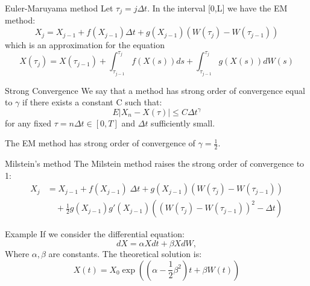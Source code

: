\begin{frame}{Euler-Maruyama method}
Let $\tau_j=j\Delta t$. In the interval [0,L] we have the EM method:\bigskip\\
$$X_j=X_{j-1}+f(X_{j-1})\Delta t+g(X_{j-1})(W(\tau_j)-W(\tau_{j-1}))$$
 which is an approximation for the equation
$$X(\tau_j)=X(\tau_{j-1})+\int_{\tau_{j-1}}^{\tau_{j}}f(X(s))ds+\int_
{\tau_{j-1}}^{\tau_{j}}g(X(s))dW(s)$$
\end{frame}

\begin{frame}
\begin{block}{Strong Convergence}
We say that a method has strong order of convergence equal to $\gamma$ if there exists a constant C such that:
$$E|X_n-X(\tau)|\leq C \Delta t^\gamma$$
for any fixed $\tau=n \Delta t \in [0,T]$ and $\Delta t$ sufficiently small.
\end{block}
\bigskip
The EM method has strong order of convergence of $\gamma=\frac{1}{2}$.
\end{frame}

\begin{frame}{Milstein's method}
The Milstein method raises the strong order of convergence to 1:	
	\begin{equation*}
	\begin{split}
	X_{j} & =X_{j-1}+ f(X_{j-1}) \; \Delta t + g(X_{j-1})(W(\tau_j)-W(\tau_{j-1}))\\
	  &\quad +\frac{1}{2}g(X_{j-1})g'(X_{j-1})((W(\tau_j)-W(\tau_{j-1}))^2-\Delta t)
	\end{split}
	\end{equation*}
\end{frame}

\begin{frame}{Example}
If we consider the differential equation:
\begin{equation*}
  dX=\alpha X dt+ \beta X dW,
\end{equation*}
Where $\alpha, \beta$ are constants. The theoretical solution is: 
\begin{equation*}
  X(t)=X_{0}\exp{\left((\alpha -\frac{1}{2}\beta ^2)t +\beta W(t)\right)}
\end{equation*}
\end{frame}

